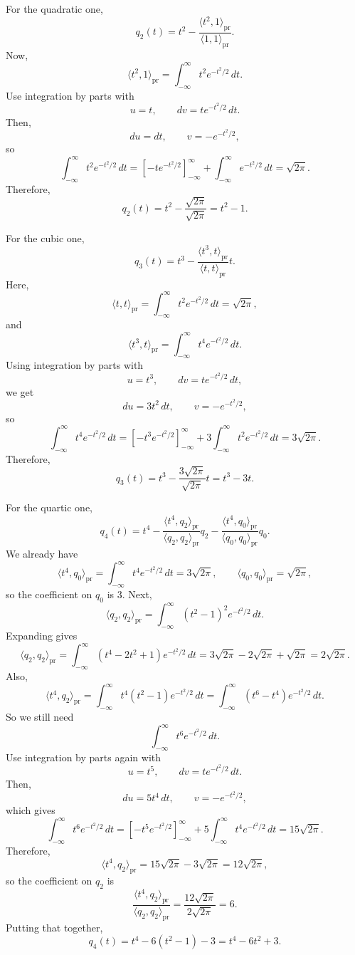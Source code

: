 \documentclass[10pt]{extarticle}
\begin{document}
\begin{enumerate}[label=(\alph*)]
For the quadratic one,
\[
q_2(t)=t^2-\frac{\langle t^2,1\rangle_{\mathrm{pr}}}{\langle 1,1\rangle_{\mathrm{pr}}}.
\]
Now,
\[
\langle t^2,1\rangle_{\mathrm{pr}}
=\int_{-\infty}^{\infty} t^2e^{-t^2/2}\,dt.
\]
Use integration by parts with
\[
u=t,\qquad dv=te^{-t^2/2}\,dt.
\]
Then,
\[
du=dt,\qquad v=-e^{-t^2/2},
\]
so
\[
\int_{-\infty}^{\infty} t^2e^{-t^2/2}\,dt
=\left[-te^{-t^2/2}\right]_{-\infty}^{\infty}
+\int_{-\infty}^{\infty} e^{-t^2/2}\,dt
=\sqrt{2\pi}.
\]
Therefore,
\[
q_2(t)=t^2-\frac{\sqrt{2\pi}}{\sqrt{2\pi}}
=t^2-1.
\]

For the cubic one,
\[
q_3(t)=t^3-\frac{\langle t^3,t\rangle_{\mathrm{pr}}}{\langle t,t\rangle_{\mathrm{pr}}}t.
\]
Here,
\[
\langle t,t\rangle_{\mathrm{pr}}
=\int_{-\infty}^{\infty} t^2e^{-t^2/2}\,dt
=\sqrt{2\pi},
\]
and
\[
\langle t^3,t\rangle_{\mathrm{pr}}
=\int_{-\infty}^{\infty} t^4e^{-t^2/2}\,dt.
\]
Using integration by parts with
\[
u=t^3,\qquad dv=te^{-t^2/2}\,dt,
\]
we get
\[
du=3t^2\,dt,\qquad v=-e^{-t^2/2},
\]
so
\[
\int_{-\infty}^{\infty} t^4e^{-t^2/2}\,dt
=\left[-t^3e^{-t^2/2}\right]_{-\infty}^{\infty}
+3\int_{-\infty}^{\infty} t^2e^{-t^2/2}\,dt
=3\sqrt{2\pi}.
\]
Therefore,
\[
q_3(t)=t^3-\frac{3\sqrt{2\pi}}{\sqrt{2\pi}}t
=t^3-3t.
\]

For the quartic one,
\[
q_4(t)=t^4-\frac{\langle t^4,q_2\rangle_{\mathrm{pr}}}{\langle q_2,q_2\rangle_{\mathrm{pr}}}q_2
-\frac{\langle t^4,q_0\rangle_{\mathrm{pr}}}{\langle q_0,q_0\rangle_{\mathrm{pr}}}q_0.
\]
We already have
\[
\langle t^4,q_0\rangle_{\mathrm{pr}}
=\int_{-\infty}^{\infty} t^4e^{-t^2/2}\,dt
=3\sqrt{2\pi},
\qquad
\langle q_0,q_0\rangle_{\mathrm{pr}}=\sqrt{2\pi},
\]
so the coefficient on $q_0$ is $3$. Next,
\[
\langle q_2,q_2\rangle_{\mathrm{pr}}
=\int_{-\infty}^{\infty} (t^2-1)^2e^{-t^2/2}\,dt.
\]
Expanding gives
\[
\langle q_2,q_2\rangle_{\mathrm{pr}}
=\int_{-\infty}^{\infty} (t^4-2t^2+1)e^{-t^2/2}\,dt
=3\sqrt{2\pi}-2\sqrt{2\pi}+\sqrt{2\pi}
=2\sqrt{2\pi}.
\]
Also,
\[
\langle t^4,q_2\rangle_{\mathrm{pr}}
=\int_{-\infty}^{\infty} t^4(t^2-1)e^{-t^2/2}\,dt
=\int_{-\infty}^{\infty} (t^6-t^4)e^{-t^2/2}\,dt.
\]
So we still need
\[
\int_{-\infty}^{\infty} t^6e^{-t^2/2}\,dt.
\]
Use integration by parts again with
\[
u=t^5,\qquad dv=te^{-t^2/2}\,dt.
\]
Then,
\[
du=5t^4\,dt,\qquad v=-e^{-t^2/2},
\]
which gives
\[
\int_{-\infty}^{\infty} t^6e^{-t^2/2}\,dt
=\left[-t^5e^{-t^2/2}\right]_{-\infty}^{\infty}
+5\int_{-\infty}^{\infty} t^4e^{-t^2/2}\,dt
=15\sqrt{2\pi}.
\]
Therefore,
\[
\langle t^4,q_2\rangle_{\mathrm{pr}}
=15\sqrt{2\pi}-3\sqrt{2\pi}
=12\sqrt{2\pi},
\]
so the coefficient on $q_2$ is
\[
\frac{\langle t^4,q_2\rangle_{\mathrm{pr}}}{\langle q_2,q_2\rangle_{\mathrm{pr}}}
=\frac{12\sqrt{2\pi}}{2\sqrt{2\pi}}
=6.
\]
Putting that together,
\[
q_4(t)=t^4-6(t^2-1)-3=t^4-6t^2+3.
\]


\end{enumerate}
\end{document}
